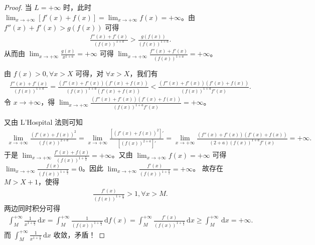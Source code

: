 \documentclass[../../main.tex]{subfiles}%
\begin{document}
\begin{proof}
\two 当 \( L = +\infty \) 时，此时 \( \lim_{x \to +\infty} \left[ f'(x) + f(x) \right] = \lim_{x \to +\infty} f(x) = +\infty \)。由 \( f''(x) + f'(x) > g(f(x)) \) 可得
\begin{align*}
\frac{f''(x) + f'(x)}{\left( f(x) \right)^{1 + a}} > \frac{g(f(x))}{\left( f(x) \right)^{1 + a}} .
\end{align*}
从而由 \( \lim_{x \to +\infty} \frac{g(x)}{x^{1 + a}} = +\infty \) 可得 \( \lim_{x \to +\infty} \frac{f''(x) + f'(x)}{\left( f(x) \right)^{1 + a}} = +\infty \)。

由 \( f(x) > 0, \forall x > X \) 可得，对 \( \forall x > X \)，我们有
\begin{align*}
\frac{f''(x) + f'(x)}{\left( f(x) \right)^{1 + a}} = \frac{\left( f''(x) + f'(x) \right) \left( f'(x) + f(x) \right)}{\left( f(x) \right)^{1 + a} \left( f'(x) + f(x) \right)} < \frac{\left( f''(x) + f'(x) \right) \left( f'(x) + f(x) \right)}{\left( f(x) \right)^{1 + a} f'(x)}.
\end{align*}
令 \( x \to +\infty \)，得 \( \lim_{x \to +\infty} \frac{\left( f''(x) + f'(x) \right) \left( f'(x) + f(x) \right)}{\left( f(x) \right)^{1 + a} f'(x)} = +\infty \)。

又由 L'Hospital 法则可知
\begin{align*}
\lim_{x \to +\infty} \frac{\left( f'(x) + f(x) \right)^2}{\left( f(x) \right)^{2 + a}} = \lim_{x \to +\infty} \frac{\left[ \left( f'(x) + f(x) \right)^2 \right]'}{\left[ \left( f(x) \right)^{2 + a} \right]'} = \lim_{x \to +\infty} \frac{\left( f''(x) + f'(x) \right) \left( f'(x) + f(x) \right)}{(2 + a) \left( f(x) \right)^{1 + a} f'(x)} = +\infty.
\end{align*}
于是 \( \lim_{x \to +\infty} \frac{f'(x) + f(x)}{\left( f(x) \right)^{1 + \frac{a}{2}}} = +\infty \)。又由 \( \lim_{x \to +\infty} f(x) = +\infty \) 可得 \( \lim_{x \to +\infty} \frac{f(x)}{\left( f(x) \right)^{1 + \frac{a}{2}}} = 0 \)。因此 \( \lim_{x \to +\infty} \frac{f'(x)}{\left( f(x) \right)^{1 + \frac{a}{2}}} = +\infty \)。
故存在 \( M > X + 1 \)，使得
\begin{align*}
\frac{f'(x)}{\left( f(x) \right)^{1 + \frac{a}{2}}} > 1, \forall x > M.
\end{align*}
两边同时积分可得
\begin{align*}
\int_M^{+\infty} \frac{1}{x^{1 + \frac{a}{2}}} \, \mathrm{d}x = \int_M^{+\infty} \frac{1}{\left( f(x) \right)^{1 + \frac{a}{2}}} \, \mathrm{d}f(x) = \int_M^{+\infty} \frac{f'(x)}{\left( f(x) \right)^{1 + \frac{a}{2}}} \, \mathrm{d}x \geqslant  \int_M^{+\infty} \, \mathrm{d}x = +\infty.
\end{align*}
而 \( \int_M^{+\infty} \frac{1}{x^{1 + \frac{a}{2}}} \, \mathrm{d}x \) 收敛，矛盾！
\end{proof}
\end{document}
